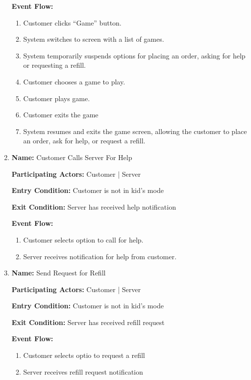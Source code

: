 \documentclass[11pt]{article}
\begin{document}
\begin{enumerate}
			\textbf{Event Flow:}
			\begin{enumerate}
				\setlength{\leftskip}{1cm}
				\item Customer clicks “Game” button.
				\item System switches to screen with a list of games.
				\item System temporarily suspends options for placing an order, asking for help or requesting a refill.
				\item Customer chooses a game to play.
				\item Customer plays game.
				\item Customer exits the game
				\item System resumes and exits the game screen, allowing the customer to place an order, ask for help, or request a refill. \\
			\end{enumerate}

		\item \textbf{Name:} 				Customer Calls Server For Help

			\textbf{Participating Actors:} 	Customer | Server

			\textbf{Entry Condition:} 		Customer is not in kid's mode

			\textbf{Exit Condition:} 		Server has received help notification

			\textbf{Event Flow:}
			\begin{enumerate}
				\setlength{\leftskip}{1cm}
				\item Customer selects option to call for help.
				\item Server receives notification for help from customer.\\
			\end{enumerate}

		\item \textbf{Name:} 				Send Request for Refill

			\textbf{Participating Actors:} 	Customer | Server

			\textbf{Entry Condition:} 		Customer is not in kid's mode

			\textbf{Exit Condition:} 		Server has received refill request

			\textbf{Event Flow:}
			\begin{enumerate}
				\setlength{\leftskip}{1cm}
				\item Customer selects optio to request a refill
				\item Server receives refill request notification\\
			\end{enumerate}


\end{enumerate}
\end{document}
